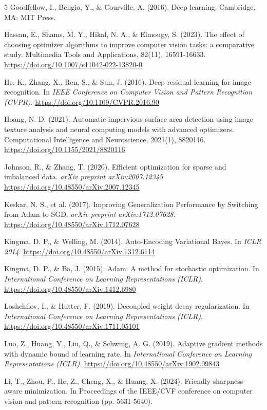 \documentclass[10pt,twocolumn]{article}
\begin{document}
\begin{thebibliography}{5}
Goodfellow, I., Bengio, Y., \& Courville, A. (2016). Deep learning. Cambridge, MA: MIT Press.

Hassan, E., Shams, M. Y., Hikal, N. A., \& Elmougy, S. (2023). The effect of choosing optimizer algorithms to improve computer vision tasks: a comparative study. Multimedia Tools and Applications, 82(11), 16591-16633. \url{https://doi.org/10.1007/s11042-022-13820-0}

He, K., Zhang, X., Ren, S., \& Sun, J. (2016). Deep residual learning for image recognition. In \textit{IEEE Conference on Computer Vision and Pattern Recognition (CVPR)}. \url{https://doi.org/10.1109/CVPR.2016.90}

Hoang, N. D. (2021). Automatic impervious surface area detection using image texture analysis and neural computing models with advanced optimizers. Computational Intelligence and Neuroscience, 2021(1), 8820116. \url{https://doi.org/10.1155/2021/8820116}

Johnson, R., \& Zhang, T. (2020). Efficient optimization for sparse and imbalanced data. \textit{arXiv preprint arXiv:2007.12345}. \url{https://doi.org/10.48550/arXiv.2007.12345}

Keskar, N. S., et al. (2017). Improving Generalization Performance by Switching from Adam to SGD. \textit{arXiv preprint arXiv:1712.07628}. \url{https://doi.org/10.48550/arXiv.1712.07628}

Kingma, D. P., \& Welling, M. (2014). Auto-Encoding Variational Bayes. In \textit{ICLR 2014}. \url{https://doi.org/10.48550/arXiv.1312.6114}

Kingma, D. P., \& Ba, J. (2015). Adam: A method for stochastic optimization. In \textit{International Conference on Learning Representations (ICLR)}. \url{https://doi.org/10.48550/arXiv.1412.6980}

Loshchilov, I., \& Hutter, F. (2019). Decoupled weight decay regularization. In \textit{International Conference on Learning Representations (ICLR)}. \url{https://doi.org/10.48550/arXiv.1711.05101}

Luo, Z., Huang, Y., Liu, Q., \& Schwing, A. G. (2019). Adaptive gradient methods with dynamic bound of learning rate. In \textit{International Conference on Learning Representations (ICLR)}. \url{https://doi.org/10.48550/arXiv.1902.09843}

Li, T., Zhou, P., He, Z., Cheng, X., \& Huang, X. (2024). Friendly sharpness-aware minimization. In Proceedings of the IEEE/CVF conference on computer vision and pattern recognition (pp. 5631-5640).



\end{thebibliography}
\end{document}
